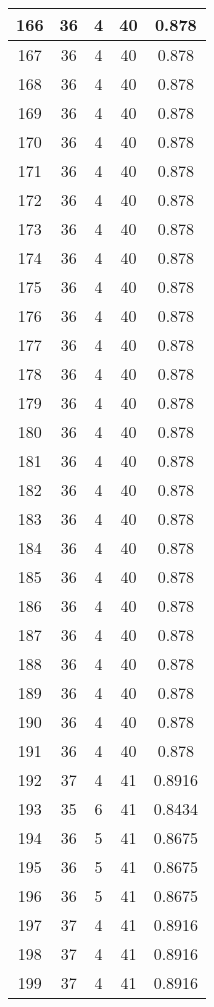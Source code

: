 \documentclass[letterpaper, 12pt]{article}
\begin{document}
\begin{longtable}{|c|c|c|c|c|}
\hline
166 & 36 & 4 & 40 & 0.878 \\
\hline
167 & 36 & 4 & 40 & 0.878 \\
\hline
168 & 36 & 4 & 40 & 0.878 \\
\hline
169 & 36 & 4 & 40 & 0.878 \\
\hline
170 & 36 & 4 & 40 & 0.878 \\
\hline
171 & 36 & 4 & 40 & 0.878 \\
\hline
172 & 36 & 4 & 40 & 0.878 \\
\hline
173 & 36 & 4 & 40 & 0.878 \\
\hline
174 & 36 & 4 & 40 & 0.878 \\
\hline
175 & 36 & 4 & 40 & 0.878 \\
\hline
176 & 36 & 4 & 40 & 0.878 \\
\hline
177 & 36 & 4 & 40 & 0.878 \\
\hline
178 & 36 & 4 & 40 & 0.878 \\
\hline
179 & 36 & 4 & 40 & 0.878 \\
\hline
180 & 36 & 4 & 40 & 0.878 \\
\hline
181 & 36 & 4 & 40 & 0.878 \\
\hline
182 & 36 & 4 & 40 & 0.878 \\
\hline
183 & 36 & 4 & 40 & 0.878 \\
\hline
184 & 36 & 4 & 40 & 0.878 \\
\hline
185 & 36 & 4 & 40 & 0.878 \\
\hline
186 & 36 & 4 & 40 & 0.878 \\
\hline
187 & 36 & 4 & 40 & 0.878 \\
\hline
188 & 36 & 4 & 40 & 0.878 \\
\hline
189 & 36 & 4 & 40 & 0.878 \\
\hline
190 & 36 & 4 & 40 & 0.878 \\
\hline
191 & 36 & 4 & 40 & 0.878 \\
\hline
192 & 37 & 4 & 41 & 0.8916 \\
\hline
193 & 35 & 6 & 41 & 0.8434 \\
\hline
194 & 36 & 5 & 41 & 0.8675 \\
\hline
195 & 36 & 5 & 41 & 0.8675 \\
\hline
196 & 36 & 5 & 41 & 0.8675 \\
\hline
197 & 37 & 4 & 41 & 0.8916 \\
\hline
198 & 37 & 4 & 41 & 0.8916 \\
\hline
199 & 37 & 4 & 41 & 0.8916 \\
\hline
\end{longtable}
\end{document}
